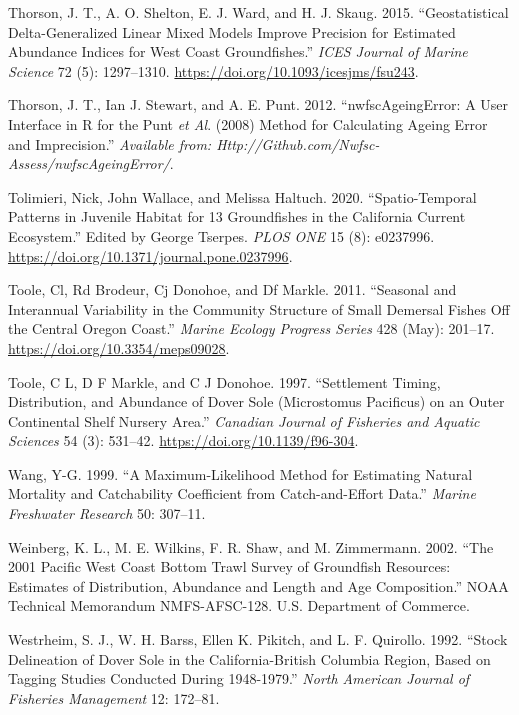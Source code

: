 \documentclass[11pt,
  english,
  a4paper,
]{article}
\begin{document}
\begin{cslreferences}
\leavevmode\hypertarget{ref-thorson_geostatistical_2015}{}%
Thorson, J. T., A. O. Shelton, E. J. Ward, and H. J. Skaug. 2015. ``Geostatistical Delta-Generalized Linear Mixed Models Improve Precision for Estimated Abundance Indices for West Coast Groundfishes.'' \emph{ICES Journal of Marine Science} 72 (5): 1297--1310. \url{https://doi.org/10.1093/icesjms/fsu243}.

\leavevmode\hypertarget{ref-thorson_nwfscageingerror:_2012}{}%
Thorson, J. T., Ian J. Stewart, and A. E. Punt. 2012. ``nwfscAgeingError: A User Interface in R for the Punt \emph{et Al}. (2008) Method for Calculating Ageing Error and Imprecision.'' \emph{Available from: Http://Github.com/Nwfsc-Assess/nwfscAgeingError/}.

\leavevmode\hypertarget{ref-tolimieri_spatio-temporal_2020}{}%
Tolimieri, Nick, John Wallace, and Melissa Haltuch. 2020. ``Spatio-Temporal Patterns in Juvenile Habitat for 13 Groundfishes in the California Current Ecosystem.'' Edited by George Tserpes. \emph{PLOS ONE} 15 (8): e0237996. \url{https://doi.org/10.1371/journal.pone.0237996}.

\leavevmode\hypertarget{ref-toole_seasonal_2011}{}%
Toole, Cl, Rd Brodeur, Cj Donohoe, and Df Markle. 2011. ``Seasonal and Interannual Variability in the Community Structure of Small Demersal Fishes Off the Central Oregon Coast.'' \emph{Marine Ecology Progress Series} 428 (May): 201--17. \url{https://doi.org/10.3354/meps09028}.

\leavevmode\hypertarget{ref-toole_settlement_1997}{}%
Toole, C L, D F Markle, and C J Donohoe. 1997. ``Settlement Timing, Distribution, and Abundance of Dover Sole (Microstomus Pacificus) on an Outer Continental Shelf Nursery Area.'' \emph{Canadian Journal of Fisheries and Aquatic Sciences} 54 (3): 531--42. \url{https://doi.org/10.1139/f96-304}.

\leavevmode\hypertarget{ref-Wang1999}{}%
Wang, Y-G. 1999. ``A Maximum-Likelihood Method for Estimating Natural Mortality and Catchability Coefficient from Catch-and-Effort Data.'' \emph{Marine Freshwater Research} 50: 307--11.

\leavevmode\hypertarget{ref-weinberg_2001_2002}{}%
Weinberg, K. L., M. E. Wilkins, F. R. Shaw, and M. Zimmermann. 2002. ``The 2001 Pacific West Coast Bottom Trawl Survey of Groundfish Resources: Estimates of Distribution, Abundance and Length and Age Composition.'' NOAA Technical Memorandum NMFS-AFSC-128. U.S. Department of Commerce.

\leavevmode\hypertarget{ref-westrheim_stock_1992}{}%
Westrheim, S. J., W. H. Barss, Ellen K. Pikitch, and L. F. Quirollo. 1992. ``Stock Delineation of Dover Sole in the California-British Columbia Region, Based on Tagging Studies Conducted During 1948-1979.'' \emph{North American Journal of Fisheries Management} 12: 172--81.


\end{cslreferences}
\end{document}
